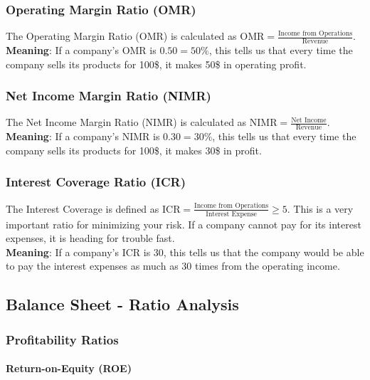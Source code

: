 \subsubsection{Operating Margin Ratio (OMR)}

The Operating Margin Ratio (OMR) is calculated as
$\text{OMR} = \frac{\text{Income from Operations}}{\text{Revenue}}$.\\
\textbf{Meaning}: If a company's OMR is $0.50 = 50\%$, this tells us that every
time the company sells its products for 100\$, it makes 50\$ in operating profit.

\subsubsection{Net Income Margin Ratio (NIMR)}

The Net Income Margin Ratio (NIMR) is calculated as
$\text{NIMR} = \frac{\text{Net Income}}{\text{Revenue}}$.\\
\textbf{Meaning}: If a company's NIMR is $0.30 = 30\%$, this tells us that every
time the company sells its products for 100\$, it makes 30\$ in profit.

\subsubsection{Interest Coverage Ratio (ICR)}

The Interest Coverage is defined as
$\text{ICR} = \frac{\text{Income from Operations}}{\text{Interest Expense}} \geq 5$.
This is a very important ratio for minimizing your risk. If a company cannot pay
for its interest expenses, it is heading for trouble fast.\\
\textbf{Meaning}: If a company's ICR is $30$, this tells us that the company would
be able to pay the interest expenses as much as 30 times from the operating income.

\subsection{Balance Sheet - Ratio Analysis}

\subsubsection{Profitability Ratios}

\paragraph{Return-on-Equity (ROE)}

